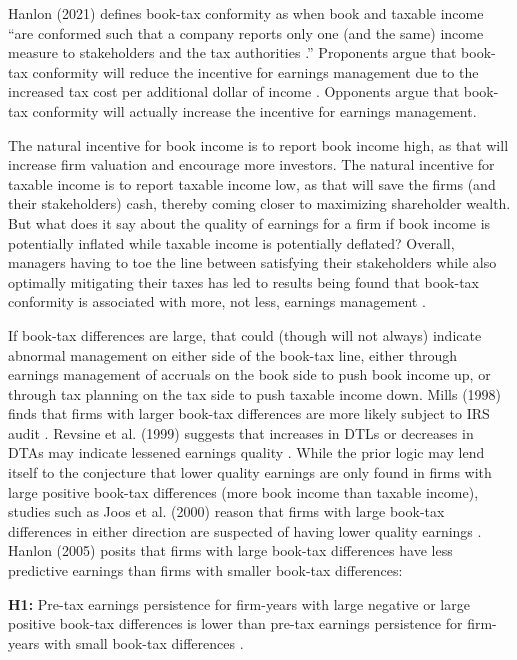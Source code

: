 \documentclass{article}
\begin{document}
Hanlon (2021) defines book-tax conformity as when book and taxable income “are conformed such that a company reports only one (and the same) income measure to stakeholders and the tax authorities \citet{Hanlon21}.” Proponents argue that book-tax conformity will reduce the incentive for earnings management due to the increased tax cost per additional dollar of income \citet{Blaylock15}. Opponents argue that book-tax conformity will actually increase the incentive for earnings management.

The natural incentive for book income is to report book income high, as that will increase firm valuation and encourage more investors. The natural incentive for taxable income is to report taxable income low, as that will save the firms (and their stakeholders) cash, thereby coming closer to maximizing shareholder wealth. But what does it say about the quality of earnings for a firm if book income is potentially inflated while taxable income is potentially deflated? Overall, managers having to toe the line between satisfying their stakeholders while also optimally mitigating their taxes has led to results being found that book-tax conformity is associated with more, not less, earnings management \citet{Blaylock15} \citet{Hanlon21}. 

If book-tax differences are large, that could (though will not always) indicate abnormal management on either side of the book-tax line, either through earnings management of accruals on the book side to push book income up, or through tax planning on the tax side to push taxable income down. Mills (1998) finds that firms with larger book-tax differences are more likely subject to IRS audit \citet{Mills98}. Revsine et al. (1999) suggests that increases in DTLs or decreases in DTAs may indicate lessened earnings quality \citet{Revsine99}. While the prior logic may lend itself to the conjecture that lower quality earnings are only found in firms with large positive book-tax differences (more book income than taxable income), studies such as Joos et al. (2000) reason that firms with large book-tax differences in either direction are suspected of having lower quality earnings \citet{Joos00}. Hanlon (2005) posits that firms with large book-tax differences have less predictive earnings than firms with smaller book-tax differences:

\textbf{H1:} Pre-tax earnings persistence for firm-years with large negative or large positive book-tax differences is lower than pre-tax earnings persistence for firm-years with small book-tax differences \citet{Hanlon05}.
\end{document}
